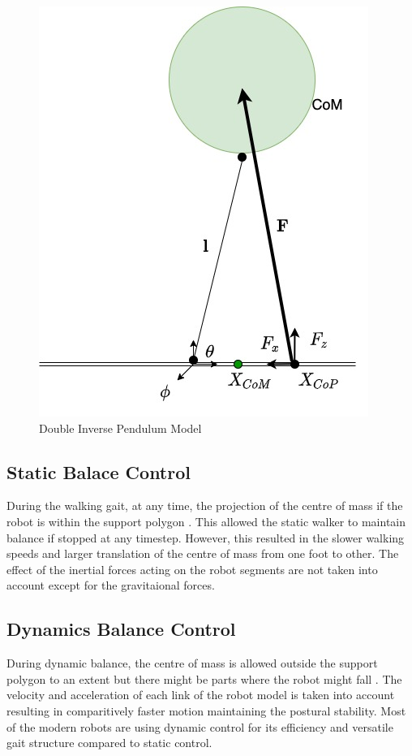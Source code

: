 \begin{figure}[h!]
    \centering
    \includegraphics[scale=0.5]{images/SIPM.jpg}\hfill
    \caption{Double Inverse Pendulum Model}\hfill
    \label{fig: sipm}
\end{figure}

\subsection{Static Balace Control}

During the walking gait, at any time, the projection of the centre of mass if the robot is within the support
polygon \cite{katic2003survey}. This allowed the static walker to maintain balance if stopped at any timestep.
However, this resulted in the slower walking speeds and larger translation of the centre of mass from one foot to
other. The effect of the inertial forces acting on the robot segments are not taken into account except for the 
gravitaional forces.

\subsection{ Dynamics Balance Control}

During dynamic balance, the centre of mass is allowed outside the support polygon to an extent but there might be 
parts where the robot might fall \cite{katic2003survey}. The velocity and acceleration of each link of the robot
model is taken into account resulting in comparitively faster motion maintaining the postural stability. Most of the
modern robots are using dynamic control for its efficiency and versatile gait structure compared to static control.



